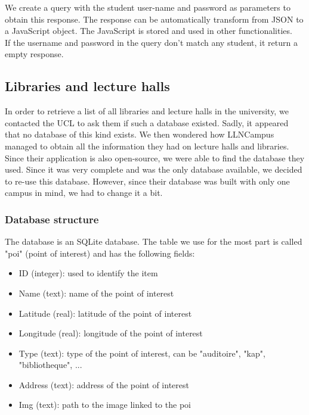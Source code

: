 \documentclass{eplmastersthesis}
\begin{document}
We create a query with the student user-name and password as parameters to obtain this response. The response can be automatically transform from JSON to a JavaScript object. The JavaScript is stored and used in other functionalities.\\

If the username and password in the query don't match any student, it return a empty response. 



\subsection{Libraries and lecture halls}

In order to retrieve a list of all libraries and lecture halls in the university, we contacted the UCL to ask them if such a database existed. Sadly, it appeared that no database of this kind exists. We then wondered how LLNCampus managed to obtain all the information they had on lecture halls and libraries. Since their application is also open-source, we were able to find the database they used. Since it was very complete and was the only database available, we decided to re-use this database. However, since their database was built with only one campus in mind, we had to change it a bit.

\subsubsection{Database structure}
 
The database is an SQLite database. The table we use for the most part is called "poi" (point of interest) and has the following fields:

\begin{itemize}
\item ID (integer): used to identify the item
\item Name (text): name of the point of interest
\item Latitude (real): latitude of the point of interest
\item Longitude (real): longitude of the point of interest
\item Type (text): type of the point of interest, can be "auditoire", "kap",   "bibliotheque", ...
\item Address (text): address of the point of interest
\item Img (text): path to the image linked to the poi
\end{itemize}
\end{document}
